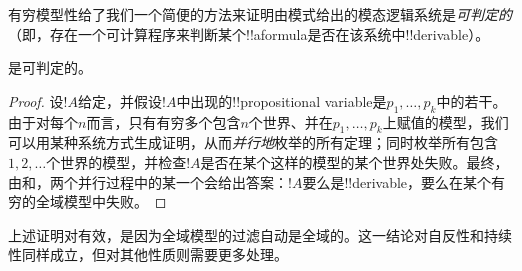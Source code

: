 \documentclass[../../../include/open-logic-section]{subfiles}
\begin{document}

有穷模型性给了我们一个简便的方法来证明由模式给出的模态逻辑系统是\emph{可判定的}（即，存在一个可计算程序来判断某个!!a{formula}是否在该系统中!!{derivable}）。

\begin{thm}
   是可判定的。
\end{thm}

\begin{proof}
  设$!A$给定，并假设$!A$中出现的!!{propositional variable}是$p_1, \dots, p_k$中的若干。由于对每个$n$而言，只有有穷多个包含$n$个世界、并在$p_1, \dots, p_k$上赋值的模型，我们可以用某种系统方式生成证明，从而\emph{并行地}枚举的所有定理；同时枚举所有包含$1, 2, \dots$个世界的模型，并检查$!A$是否在某个这样的模型的某个世界处失败。最终，由和，两个并行过程中的某一个会给出答案：$!A$要么是!!{derivable}，要么在某个有穷的全域模型中失败。
\end{proof}

上述证明对有效，是因为全域模型的过滤自动是全域的。这一结论对自反性和持续性同样成立，但对其他性质则需要更多处理。
\end{document}
